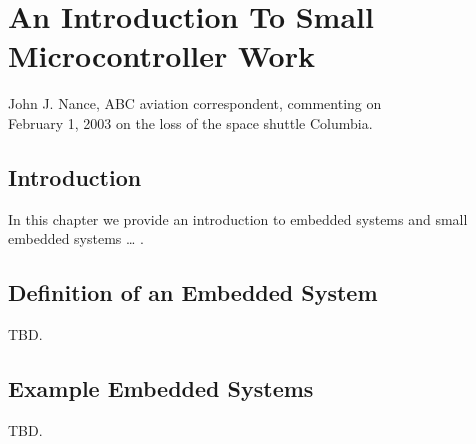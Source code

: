 
\chapter[Introduction To Microcontroller Work]{An Introduction To
Small Microcontroller Work}

\label{cint0}

                   {John J. Nance, ABC aviation correspondent, 
				    commenting on \\
					February 1, 2003 on the loss of the space 
					shuttle Columbia.}

\section{Introduction}
\label{cint0:sint0}

In this chapter we provide an introduction to embedded systems and 
small embedded systems \ldots{} .

\section{Definition of an Embedded System}
\label{cint0:sdef0}

TBD.

\section{Example Embedded Systems}
\label{cint0:sexa0}

TBD.

